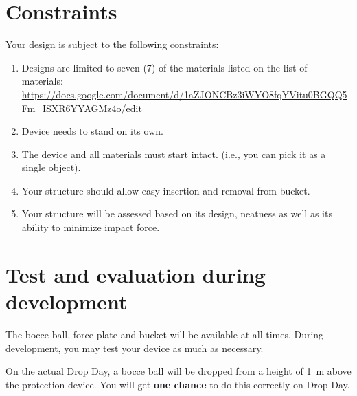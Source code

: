 \documentclass[hw]{exam}
\begin{document}
\section{Constraints}
Your design is subject to the following constraints:
\begin{enumerate}
\item Designs are limited to seven (7) of the materials listed on the list of materials: \url{https://docs.google.com/document/d/1aZJONCBz3iWYO8fqYVitu0BGQQ5Fm_ISXR6YYAGMz4o/edit}
\item Device needs to stand on its own. 
\item The device and all materials must start intact. (i.e., you can pick it as a single object).
\item Your structure should allow easy insertion and removal from bucket.
\item Your structure will be assessed based on its design, neatness as well as its ability to minimize impact force. 
\end{enumerate}

\section{Test and evaluation during development} 
The bocce ball, force plate and bucket will be available at all times. During development, you may test your device as much as necessary. 

On the actual Drop Day, a bocce ball will be dropped from a height of \SI{1}{\meter} above the protection device.  You will get \textbf{one chance} to do this correctly on Drop Day. 
 
\end{document}
